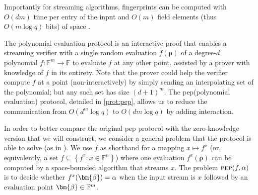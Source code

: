 \documentclass[10pt,a4paper]{article}
\theoremstyle{definition}
\newcommand{\field}{\mathbb{F}}
\renewcommand{\set}[1]{\left\{#1\right\}}
\newcommand{\pep}{\normalfont\textsc{pep}\xspace}
\newcommand{\pepprotocol}{\textsf{pep}\xspace}
\newcommand{\dimension}{m}
\newcommand{\degree}{d}
\newcommand{\fieldsize}{q}
\newcommand{\evaluationpoint}{\bm{\fe2}}
\newcommand{\fingerprinttuple}{\bm{\rho}}
\def\fe#1{
    \ifnum#1=1
        \alpha
    \else
    \ifnum#1=2
        \beta
    \else
    \ifnum#1=3
        \gamma
    \fi\fi\fi
}
\begin{document}
Importantly for streaming algorithms, fingerprints can be computed with $O(\degree \dimension)$ time per entry of the input and $O(\dimension)$ field elements (thus $O(\dimension \log \fieldsize)$ bits) of space \cite{CTY11}.

The polynomial evaluation protocol is an interactive proof that enables a streaming verifier with a single random evaluation $f(\fingerprinttuple)$ of a degree-$\degree$ polynomial $f:\field^\dimension\to\field$ to evaluate $f$ at any other point, assisted by a prover with knowledge of $f$ in its entirety. Note that the prover could help the verifier compute $f$ at a point (non-interactively) by simply sending an interpolating set of the polynomial; but any such set has size $(\degree + 1)^\dimension$. The \pepprotocol (polynomial evaluation) protocol, detailed in \cref{prot:pep}, allows us to reduce the communication from $O(\degree^\dimension\log \fieldsize)$ to $O(\degree \dimension \log \fieldsize)$ by adding interaction.

In order to better compare the original \pepprotocol protocol with the zero-knowledge version that we will construct, we consider a general problem that the protocol is able to solve (as in \cite{CCMTV19}). We use $f$ as shorthand for a mapping $x \mapsto f^x$ (or, equivalently, a set $f \subseteq \set{f^x : x \in \field^n}$) where one evaluation $f^x(\fingerprinttuple)$ can be computed by a space-bounded algorithm that streams $x$. The problem $\pep(f, \fe1)$ is to decide whether $f^x(\evaluationpoint) = \fe1$ when the input stream is $x$ followed by an evaluation point $\evaluationpoint \in \field^\dimension$.
\end{document}
